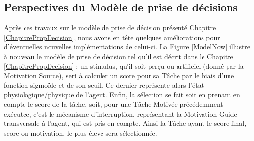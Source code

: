 	\subsection{Perspectives du Modèle de prise de décisions}
	Après ces travaux sur le modèle de prise de décision présenté Chapitre \ref{ChapitrePropDecision}, nous avons en tête quelques améliorations pour d'éventuelles nouvelles implémentations de celui-ci. La Figure \ref{ModelNow} illustre à nouveau le modèle de prise de décision tel qu'il est décrit dans le Chapitre  \ref{ChapitrePropDecision} : un stimulus, qu'il soit perçu ou artificiel (donné par la Motivation Source), sert à calculer un score pour sa Tâche par le biais d'une fonction sigmoïde et de son seuil. Ce dernier représente alors l'état physiologique/physique de l'agent. Enfin, la sélection se fait soit en prenant en compte le score de la tâche, soit, pour une Tâche Motivée précédemment exécutée, c'est le mécanisme d'interruption, représentant la Motivation Guide transversale à l'agent, qui est pris en compte. Ainsi la Tâche ayant le score final, score ou motivation, le plus élevé sera sélectionnée.
	
